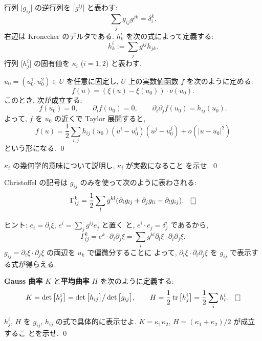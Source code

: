 \documentclass[12pt,twoside]{jarticle}
\def\trace{\mathop{\text{\rm tr}}\nolimits}          %
\def\det{\mathop{\text{\rm det}}\nolimits}          %
\def\rd{\partial}
\begin{document}
\medskip

行列 $\big[g_{ij}\big]$ の逆行列を $\big[g^{ij}\big]$ と表わす:
\[
  \sum_j g_{ij} g^{jk} = \delta_i^k.
\]
右辺は Kronecker のデルタである. $h^i_k$ を次の式によって定義する:
\[
  h^i_k := \sum_{j} g^{ij} h_{jk}.
\]
行列 $\big[h^i_j\big]$ の固有値を $\kappa_i$ ($i=1,2$) と表わす.

\begin{question}
  $u_0 = (u_0^1, u_0^2) \in U$ を任意に固定し, $U$ 上の実数値函数 $f$ 
  を次のように定める: %
  \[
    f(u) = (\xi(u) - \xi(u_0)) \cdot \nu(u_0).
  \]
  このとき, 次が成立する:
  \[
    f(u_0) = 0,
    \qquad
    \rd_i f(u_0) = 0,
    \qquad
    \rd_i \rd_j f(u_0) = h_{ij}(u_0).
  \]
  よって, $f$ を $u_0$ の近くで Taylor 展開すると,
  \[
    f(u)
    =
    \frac{1}{2}
    \sum_{i,j} h_{ij}(u_0) (u^i - u^i_0)(u^j - u^j_0)
    + o(|u - u_0|^2)
  \]
  という形になる. \qed
\end{question}

\begin{question}
  $\kappa_i$ の幾何学的意味について説明し, $\kappa_i$ が実数になること
  を示せ. \qed
\end{question}

\begin{question}
  Christoffel の記号は $g_{ij}$ のみを使って次のように表わされる:
  \[
    \Gamma^k_{ij}
    =
    \frac{1}{2}
    \sum_l g^{kl}(\rd_i g_{lj} + \rd_j g_{li} - \rd_l g_{ij}).
  \qed
  \]
\end{question}

\noindent ヒント:  $e_i = \rd_i \xi$, $e^i = \sum_j g^{ij}e_j$ と置く
と, $e^i \cdot e_j = \delta^i_j$ であるから,
\[ 
  \Gamma^k_{ij} = e^k \cdot \rd_i\rd_j\xi 
  = \sum_l g^{kl} \rd_l\xi \cdot \rd_i\rd_j\xi.
\]
$g_{ij} = \rd_i\xi \cdot \rd_j\xi$ の両辺を $u_k$ で偏微分することに
よって, $\rd_l\xi \cdot \rd_i\rd_j\xi$ を $g_{ij}$ で表示する式が得らえる.

\begin{Definition}
  {\bf Gauss 曲率} $K$ と{\bf 平均曲率} $H$ を次のように定義する:
  \[
    K = \det\big[h^i_j\big]
      = \det\big[h_{ij}\big] \big/ \det\big[g_{ij}\big],
    \qquad
    H = \frac{1}{2}\trace\big[h^i_j\big]
      = \frac{1}{2}\sum_i h^i_i.
  \qed
  \]
\end{Definition}

\begin{question}
  $h^i_j$, $H$ を $g_{ij}$, $h_{ij}$ の式で具体的に表示せよ. %
  $K = \kappa_1 \kappa_2$, $H = (\kappa_1 + \kappa_2)/2$ が成立するこ
  とを示せ.  \qed
\end{question}
\end{document}
